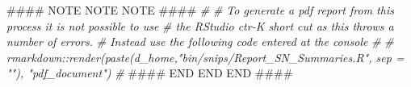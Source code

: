 \documentclass[]{article}
\newenvironment{Shaded}{\begin{snugshade}}{\end{snugshade}}
\newcommand{\CommentTok}[1]{\textcolor[rgb]{0.56,0.35,0.01}{\textit{#1}}}
\newcommand{\RegionMarkerTok}[1]{#1}
\newcommand{\AlertTok}[1]{\textcolor[rgb]{0.94,0.16,0.16}{#1}}
\newcommand{\NormalTok}[1]{#1}
\begin{document}
\begin{Shaded}
\begin{Highlighting}[]
\NormalTok{#### }\AlertTok{NOTE} \AlertTok{NOTE} \AlertTok{NOTE}\NormalTok{ ####}
\CommentTok{#}
\CommentTok{# To generate a pdf report from this process  it is not possible to use }
\CommentTok{# the RStudio ctr-K short cut as this throws a number of errors.}
\CommentTok{# Instead use the following code entered at the console}
\CommentTok{#}
\CommentTok{# rmarkdown::render(paste(d_home,"bin/snips/Report_SN_Summaries.R", sep = ""), "pdf_document")}
\CommentTok{#}
\NormalTok{#### }\RegionMarkerTok{END} \RegionMarkerTok{END} \RegionMarkerTok{END}\NormalTok{ ####}
\end{Highlighting}
\end{Shaded}
\end{document}
